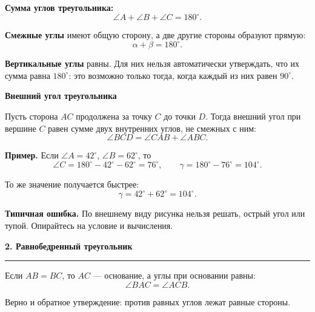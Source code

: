 \documentclass[a4paper,12pt]{article}
\newcommand{\Section}[1]{%
  \Needspace{5\baselineskip}%
  \vspace{0.6em}%
  {\Large\bfseries\color{darkaccent}#1}\par
  \vspace{0.2em}%
  {\color{accent}\rule{0.14\linewidth}{1.2pt}}\par
  \vspace{0.4em}%
}
\newcommand{\Subsection}[1]{%
  \Needspace{3\baselineskip}%
  \vspace{0.45em}%
  {\large\bfseries\color{darkaccent}#1}\par
  \vspace{0.15em}%
}
\newcommand{\Key}[1]{\textbf{\color{darkaccent}#1}}
\newcommand{\degree}{^{\circ}}
\begin{document}
\Key{Сумма углов треугольника:}
\[
  \angle A+\angle B+\angle C=180\degree.
\]

\Key{Смежные углы} имеют общую сторону, а две другие стороны образуют прямую:
\[
  \alpha+\beta=180\degree.
\]

\Key{Вертикальные углы} равны. Для них нельзя автоматически утверждать, что
их сумма равна $180\degree$: это возможно только тогда, когда каждый из них
равен $90\degree$.

\Subsection{Внешний угол треугольника}

Пусть сторона $AC$ продолжена за точку $C$ до точки $D$. Тогда внешний угол
при вершине $C$ равен сумме двух внутренних углов, не смежных с ним:
\[
  \angle BCD=\angle CAB+\angle ABC.
\]

\begin{center}
\end{center}

\Key{Пример.} Если $\angle A=42\degree$, $\angle B=62\degree$, то
\[
  \angle C
  =180\degree-42\degree-62\degree
  =76\degree,
  \qquad
  \gamma
  =180\degree-76\degree
  =104\degree.
\]

То же значение получается быстрее:
\[
  \gamma=42\degree+62\degree=104\degree.
\]

\Key{Типичная ошибка.}
По внешнему виду рисунка нельзя решать, острый угол или тупой.
Опирайтесь на условие и вычисления.

\clearpage

\Section{2. Равнобедренный треугольник}
\enlargethispage{3\baselineskip}

Если $AB=BC$, то $AC$ — основание, а углы при основании равны:
\[
  \angle BAC=\angle ACB.
\]

Верно и обратное утверждение: против равных углов лежат равные стороны.

\begin{center}
\end{center}
\end{document}
